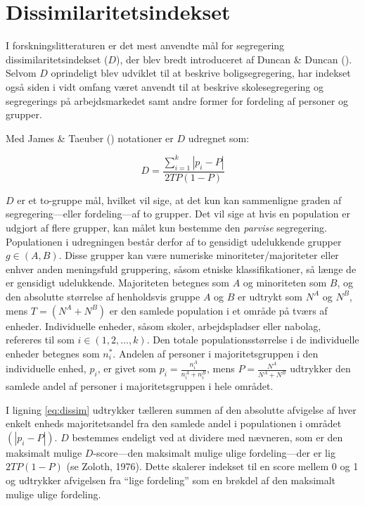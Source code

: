 \documentclass[
]{book}
\begin{document}
\section{Dissimilaritetsindekset}\label{dissimkap}

I forskningslitteraturen er det mest anvendte mål for segregering dissimilaritetsindekset (\(D\)), der blev bredt introduceret af Duncan \& Duncan (). Selvom \(D\) oprindeligt blev udviklet til at beskrive boligsegregering, har indekset også siden i vidt omfang været anvendt til at beskrive skolesegregering og segregerings på arbejdsmarkedet samt andre former for fordeling af personer og grupper.

Med James \& Taeuber () notationer er \(D\) udregnet som:

\begin{equation}
\label{eq:dissim}
D=\frac{ {\textstyle \sum_{i=1}^{k} \left | p_{i} - P \right | } }{ 2TP \left ( 1-P \right ) }
\end{equation}

\(D\) er et to-gruppe mål, hvilket vil sige, at det kun kan sammenligne graden af segregering---eller fordeling---af to grupper. Det vil sige at hvis en population er udgjort af flere grupper, kan målet kun bestemme den \emph{parvise} segregering. Populationen i udregningen består derfor af to gensidigt udelukkende grupper \(g \in (A, B)\). Disse grupper kan være numeriske minoriteter/majoriteter eller enhver anden meningsfuld gruppering, såsom etniske klassifikationer, så længe de er gensidigt udelukkende. Majoriteten betegnes som \(A\) og minoriteten som \(B\), og den absolutte størrelse af henholdsvis gruppe \(A\) og \(B\) er udtrykt som \(N^{A}\) og \(N^{B}\), mens \(T=\left( N^{A} + N^{B} \right)\) er den samlede population i et område på tværs af enheder. Individuelle enheder, såsom skoler, arbejdspladser eller nabolag, refereres til som \(i \in (1, 2, \dots, k)\). Den totale populationsstørrelse i de individuelle enheder betegnes som \(n_{i}^{*}\). Andelen af personer i majoritetsgruppen i den individuelle enhed, \(p_{i}\), er givet som \(p_{i} = \frac{n_{i}^{A}}{n_{i}^{A} + n_{i}^{B}}\), mens \(P = \frac{N^{A}}{N^{A} + N^{B}}\) udtrykker den samlede andel af personer i majoritetsgruppen i hele området.

I ligning \eqref{eq:dissim} udtrykker tælleren summen af den absolutte afvigelse af hver enkelt enheds majoritetsandel fra den samlede andel i populationen i området \(\left( \left| p_{i} - P \right| \right)\). \(D\) bestemmes endeligt ved at dividere med nævneren, som er den maksimalt mulige \(D\)-score---den maksimalt mulige ulige fordeling---der er lig \(2TP \left( 1-P \right)\) (se Zoloth, 1976). Dette skalerer indekset til en score mellem 0 og 1 og udtrykker afvigelsen fra ``lige fordeling'' som en brøkdel af den maksimalt mulige ulige fordeling.
\end{document}
